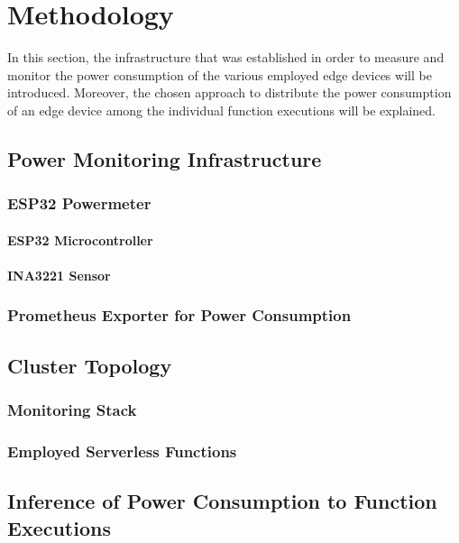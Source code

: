 \chapter{Methodology}\label{chapter:methodology}
In this section, the infrastructure that was established in order to measure and monitor the power consumption of the various employed edge devices will be introduced. Moreover, the chosen approach to distribute the power consumption of an edge device among the individual function executions will be explained.

\section{Power Monitoring Infrastructure}
\subsection{ESP32 Powermeter}
\subsubsection{ESP32 Microcontroller}
\subsubsection{INA3221 Sensor}

\subsection{Prometheus Exporter for Power Consumption}


\section{Cluster Topology}
\subsection{Monitoring Stack}

\subsection{Employed Serverless Functions}

\section{Inference of Power Consumption to Function Executions}